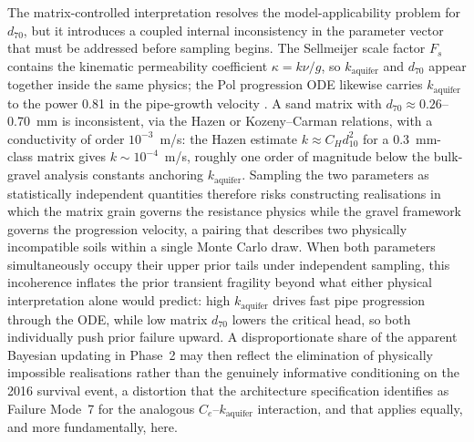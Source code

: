 The matrix-controlled interpretation resolves the model-applicability problem for $d_{70}$, but it introduces a coupled internal inconsistency in the parameter vector that must be addressed before sampling begins. The Sellmeijer scale factor $F_s$ contains the kinematic permeability coefficient $\kappa = k\nu/g$, so $k_\mathrm{aquifer}$ and $d_{70}$ appear together inside the same physics; the Pol progression ODE likewise carries $k_\mathrm{aquifer}$ to the power 0.81 in the pipe-growth velocity \parencite{pol_compgeo_2024}. A sand matrix with $d_{70} \approx 0.26$--0.70~mm is inconsistent, via the Hazen or Kozeny--Carman relations, with a conductivity of order $10^{-3}$~m/s: the Hazen estimate $k \approx C_H d_{10}^2$ for a 0.3~mm-class matrix gives $k \sim 10^{-4}$~m/s, roughly one order of magnitude below the bulk-gravel analysis constants anchoring $k_\mathrm{aquifer}$. Sampling the two parameters as statistically independent quantities therefore risks constructing realisations in which the matrix grain governs the resistance physics while the gravel framework governs the progression velocity, a pairing that describes two physically incompatible soils within a single Monte Carlo draw. When both parameters simultaneously occupy their upper prior tails under independent sampling, this incoherence inflates the prior transient fragility beyond what either physical interpretation alone would predict: high $k_\mathrm{aquifer}$ drives fast pipe progression through the ODE, while low matrix $d_{70}$ lowers the critical head, so both individually push prior failure upward. A disproportionate share of the apparent Bayesian updating in Phase~2 may then reflect the elimination of physically impossible realisations rather than the genuinely informative conditioning on the 2016 survival event, a distortion that the architecture specification identifies as Failure Mode~7 for the analogous $C_e$--$k_\mathrm{aquifer}$ interaction, and that applies equally, and more fundamentally, here.

